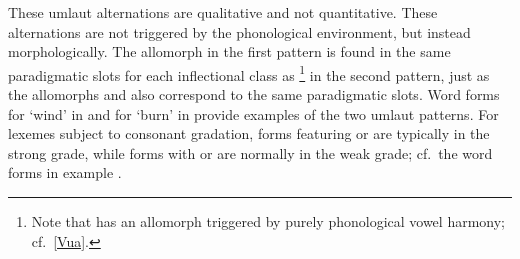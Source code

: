 These umlaut alternations are qualitative and not quantitative. %
These alternations are not triggered by the phonological environment, but instead morphologically. 
The allomorph  in the first pattern is found in the same paradigmatic slots for each inflectional class as \footnote{Note that  has an allomorph \ipa{[u͡ɛ]} triggered by purely phonological vowel harmony; cf.~\SEC\ref{Vua}.} 
in the second pattern, just as the allomorphs  and  also correspond to the same paradigmatic slots. 
Word forms for  ‘wind’ in  and for  ‘burn’ in  provide examples of the two umlaut patterns.
\ea\label{umlautEx1}%
\z
%
\ea\label{umlautEx2}%
\Tn{\begin{tabular}[t]{ll}
\ipa{/p{u͡a}lːta/}		&\ipa{/p{o}lta/}\\
\It{buallda}		&\It{buolda}\\
ignite\BS\Sc{3sg.prs}	&ignite\BS\Sc{2sg.prs}\\
\end{tabular}
\hfill\hyperlink{pit101208}{{\small [pit101208]}}}
\z
For lexemes subject to consonant gradation, forms featuring  or  are typically in the strong grade, while forms with  or  are normally in the weak grade; cf.~the word forms in example . 


